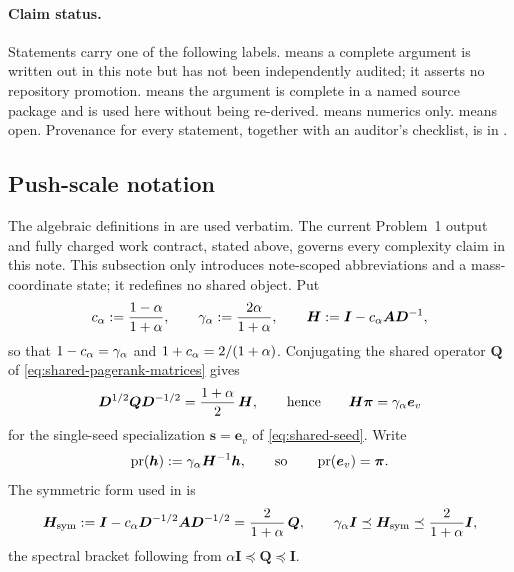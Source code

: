 \paragraph{Claim status.}
Statements carry one of the following labels.
\statusproveddraft{} means a complete argument is written out in this note but
has not been independently audited; it asserts no repository promotion.
\statusimported{} means the argument is complete in a named source package and
is used here without being re-derived. \statusmeasured{} means numerics only.
\statusopen{} means open. Provenance for every statement, together with an
auditor's checklist, is in .

\subsection*{Push-scale notation}

The algebraic definitions in
 are used verbatim. The current
Problem~1 output and fully charged work contract, stated above, governs every
complexity claim in this note. This subsection only introduces note-scoped
abbreviations and a mass-coordinate state; it redefines no shared object. Put
\begin{equation}
    c_{\alpha}:=\frac{1-\alpha}{1+\alpha},
    \qquad
    \gamma_{\alpha}:=\frac{2\alpha}{1+\alpha},
    \qquad
    \bm{H}:=\bm{I}-c_{\alpha}\bm{A}\bm{D}^{-1},
    \label{eq:ladder-push-scale-constants}
\end{equation}
so that $1-c_{\alpha}=\gamma_{\alpha}$ and $1+c_{\alpha}=2/(1+\alpha)$. Conjugating the
shared operator $\bm{Q}$ of \eqref{eq:shared-pagerank-matrices} gives
\begin{equation}
    \bm{D}^{1/2}\bm{Q}\bm{D}^{-1/2}
    =\frac{1+\alpha}{2}\,\bm{H},
    \qquad\text{hence}\qquad
    \bm{H}\bm{\pi}=\gamma_{\alpha}\bm{e}_{v}
    \label{eq:ladder-H-conjugation}
\end{equation}
for the single-seed specialization $\bm{s}=\bm{e}_{v}$ of
\eqref{eq:shared-seed}. Write
\begin{equation}
    \operatorname{pr}(\bm{h}):=\gamma_{\alpha}\bm{H}^{-1}\bm{h},
    \qquad\text{so}\qquad
    \operatorname{pr}(\bm{e}_{v})=\bm{\pi} .
    \label{eq:ladder-pr-operator}
\end{equation}
The symmetric form used in  is
\begin{equation}
    \bm{H}_{\mathrm{sym}}
    :=\bm{I}-c_{\alpha}\bm{D}^{-1/2}\bm{A}\bm{D}^{-1/2}
    =\frac{2}{1+\alpha}\,\bm{Q},
    \qquad
    \gamma_{\alpha}\bm{I}\preceq\bm{H}_{\mathrm{sym}}\preceq\frac{2}{1+\alpha}\bm{I},
    \label{eq:ladder-Hsym}
\end{equation}
the spectral bracket following from
$\alpha\bm{I}\preceq\bm{Q}\preceq\bm{I}$.

